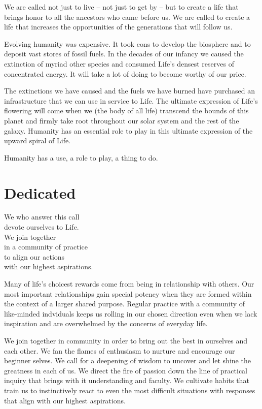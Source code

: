 \documentclass[ebook,12pt,openany,twoside]{memoir}
\newcommand{\tab}{\hspace*{2em}}
\begin{document}
We are called not just to live -- not just to get by -- but to create a life
that brings honor to all the ancestors who came before us. We are called to
create a life that increases the opportunities of the generations that will
follow us.

Evolving humanity was expensive. It took eons to develop the biosphere and to
deposit vast stores of fossil fuels. In the decades of our infancy we caused
the extinction of myriad other species and consumed Life's densest reserves of
concentrated energy. It will take a lot of doing to become worthy of our price.


The extinctions we have caused and the fuels we have burned have purchased an
infrastructure that we can use in service to Life. The ultimate expression of
Life's flowering will come when we (the body of all life) transcend the bounds
of this planet and firmly take root throughout our solar system and the rest of
the galaxy. Humanity has an essential role to play in this ultimate expression
of the upward spiral of Life.

Humanity has a use, a role to play, a thing to do.





\chapter{Dedicated}
\setlength\epigraphwidth{3.0in}
\epigraph{
  We who answer this call\\
  devote ourselves to Life.\\
  \tab We join together\\
  \tab in a community of practice\\
  \tab to align our actions\\
  \tab with our highest aspirations.
}{}

\noindent Many of life's choicest rewards come from being in relationship with
others. Our most important relationships gain special potency when they are
formed within the context of a larger shared purpose. Regular practice with a
community of like-minded indviduals keeps us rolling in our chosen direction
even when we lack inspiration and are overwhelmed by the concerns of everyday
life.

We join together in community in order to bring out the best in ourselves and
each other. We fan the flames of enthusiasm to nurture and encourage our
beginner selves. We call for a deepening of wisdom to uncover and let shine the
greatness in each of us. We direct the fire of passion down the line of
practical inquiry that brings with it understanding and faculty. We cultivate
habits that train us to instinctively react to even the most difficult
situations with responses that align with our highest aspirations.
\end{document}
